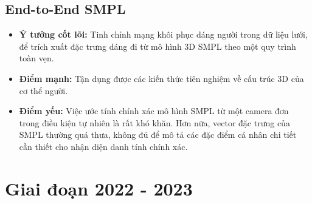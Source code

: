 \subsection{End-to-End SMPL \cite{li2020endtoend}}
\begin{itemize}
  \item \textbf{Ý tưởng cốt lõi:}
        Tinh chỉnh mạng khôi phục dáng người trong dữ liệu lưới, để trích xuất đặc trưng dáng đi từ mô hình 3D SMPL theo một quy trình toàn vẹn.

  \item \textbf{Điểm mạnh:}
        Tận dụng được các kiến thức tiên nghiệm về cấu trúc 3D của cơ thể người.

  \item \textbf{Điểm yếu:}
        Việc ước tính chính xác mô hình SMPL từ một camera đơn trong điều kiện tự nhiên là rất khó khăn. Hơn nữa, vector đặc trưng của SMPL thường quá thưa, không đủ để mô tả các đặc điểm cá nhân chi tiết cần thiết cho nhận diện danh tính chính xác.
\end{itemize}

\section{Giai đoạn 2022 - 2023}




